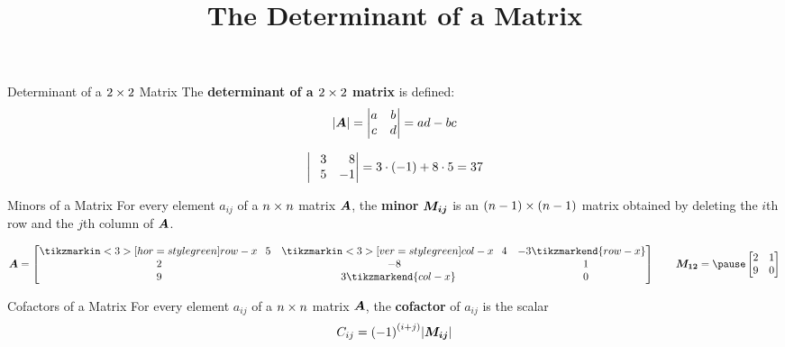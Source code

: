 \documentclass{beamer}
\title[MA245 - Section 3.4]{The Determinant of a Matrix}
\begin{document}
\begin{frame}
  \titlepage
\end{frame}

\begin{frame}
\begin{block}{Determinant of a $2 \times 2$ Matrix}
The \textbf{determinant of a $2 \times 2$ matrix} is defined:
\begin{equation*}
{\left\lvert \boldsymbol{A}\right\rvert} = 
\begin{vmatrix}
a & b \\
c & d
\end{vmatrix}
=ad-bc
\end{equation*}
\end{block}\pause
\begin{example}
\begin{equation*}
\begin{vmatrix}
\+3 & \+8\\
\+5 & -1
\end{vmatrix}
=3\cdot (-1) + 8\cdot 5=37
\end{equation*}
\end{example}
\end{frame}

\begin{frame}
\begin{block}{Minors of a Matrix}
For every element $a_{ij}$ of a $n \times n$ matrix $\boldsymbol{A}$, the \textbf{minor} $\boldsymbol{M_{ij}}$ is an $(n-1) \times (n-1)$ matrix obtained by deleting the $i$th row and the $j$th column of $\boldsymbol{A}$.
\end{block}\pause
\begin{example}
\begin{equation*}
\mat{A}=
\begin{bmatrix}
	\tikzmarkin<3>[hor=style green]{row-x}\+5 & \tikzmarkin<3>[ver=style green]{col-x}\+4 &  -3\tikzmarkend{row-x}\\
	\+2 &  -8 & \+1\\
	\+9 & \+3\tikzmarkend{col-x} & \+0\\
\end{bmatrix}
\qquad
\mat{M_{12}}=\pause
\begin{bmatrix}
		2 & 1\\
		9 & 0\\
\end{bmatrix}
\end{equation*}
\end{example}\pause
\begin{block}{Cofactors of a Matrix}
For every element $a_{ij}$ of a $n \times n$ matrix $\boldsymbol{A}$, the \textbf{cofactor} of $a_{ij}$ is the scalar
\begin{equation*}
C_{ij}={(-1)}^{(i+j)}{\left\lvert \boldsymbol{M_{ij}}\right\rvert}
\end{equation*}
\end{block}
\end{frame}
\end{document}
